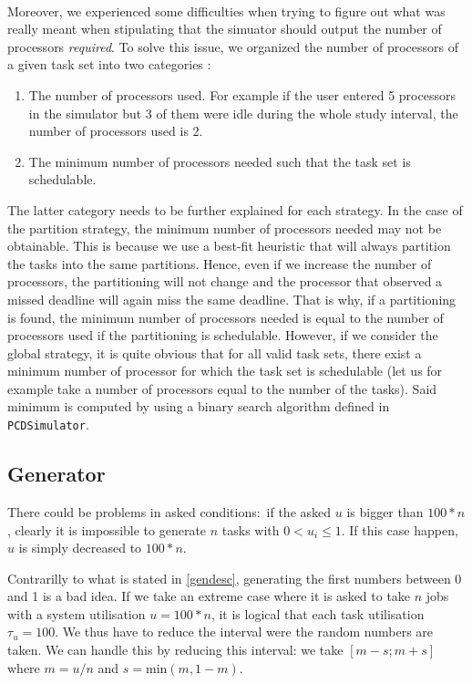 \documentclass[a4paper]{article}
\begin{document}
\paragraph{}
Moreover, we experienced some difficulties when trying to figure out what was really meant when stipulating that the simuator should output the number of processors \textit{required}. 
To solve this issue, we organized the number of processors of a given task set into two categories :
\begin{enumerate}
\item The number of processors used. For example if the user entered 5 processors in the simulator but 3 of them were idle during the whole study interval, the number of processors used is 2.
\item The minimum number of processors needed such that the task set is schedulable. 
\end{enumerate}
The latter category needs to be further explained for each strategy. In the case of the partition strategy, the minimum number of processors needed may not be obtainable. This is because we use a best-fit heuristic that will always partition the tasks into the same partitions. Hence, even if we increase the number of processors, the partitioning will not change and the processor that observed a missed deadline will again miss the same deadline. That is why, if a partitioning is found, the minimum number of processors needed is equal to the number of processors used if the partitioning is schedulable.
However, if we consider the global strategy, it is quite obvious that for all valid task sets, there exist a minimum number of processor for which the task set is schedulable (let us for example take a number of processors equal to the number of the tasks). Said minimum is computed by using a binary search algorithm defined in \texttt{PCDSimulator}.

\subsection{Generator}
There could be problems in asked conditions: if the asked $u$ is bigger than $100 * n$, clearly it is impossible to generate $n$ tasks with $0 < u_i \leq 1$. If this case happen, $u$ is simply decreased to $100 * n$.

Contrarilly to what is stated in \ref{gendesc}, generating the first numbers between 0 and 1 is a bad idea.
If we take an extreme case where it is asked to take $n$ jobs with a system utilisation $u = 100 * n$, it is logical that each task utilisation $\tau_u = 100$.
We thus have to reduce the interval were the random numbers are taken.
We can handle this by reducing this interval: we take $[m - s; m + s]$ where $m = u / n$ and $s = \text{min}(m, 1-m)$.
\end{document}
